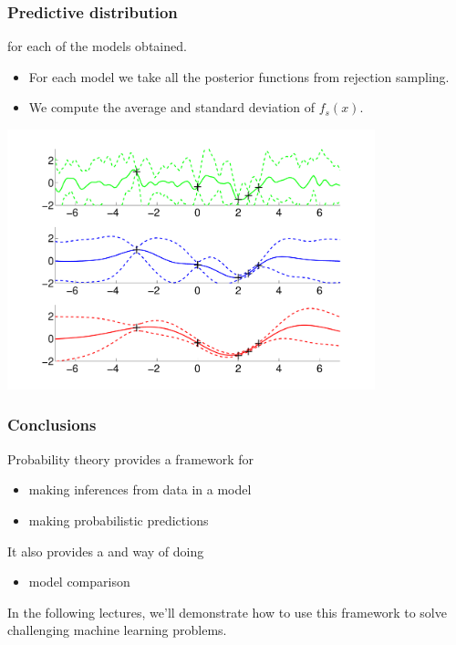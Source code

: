 \begin{frame}
\frametitle{Predictive distribution}

 for each of the models obtained.
\begin{itemize}
\item For each model we take all the posterior functions from rejection sampling.
\item We compute the average and standard deviation of $f_s(x)$.
\end{itemize}
\vspace{-0.5cm}
\parbox{\textwidth}{
\centerline{\includegraphics[width=0.8\textwidth]{rejection_sampling_predictive_distributions.pdf}}
}
\end{frame}


\begin{frame}
\frametitle{Conclusions}
Probability theory provides a framework for
\begin{itemize}
\item making inferences from data in a model
\item making probabilistic predictions
\end{itemize}

It also provides a  and  way of doing
\begin{itemize}
\item model comparison
\end{itemize}

In the following lectures, we'll demonstrate how to use this framework
to solve challenging machine learning problems.
\end{frame}

